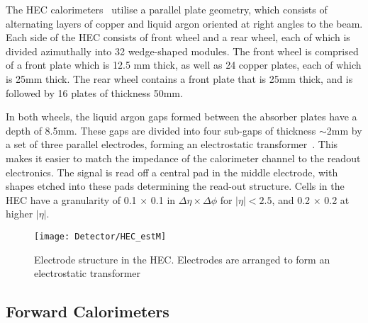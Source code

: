The HEC calorimeters~\cite{HEC_construction} utilise a parallel plate geometry, which consists of alternating layers of copper and liquid argon oriented at right angles to the beam. Each side of the HEC consists of front wheel and a rear wheel, each of which is divided azimuthally into 32 wedge-shaped modules. The front wheel is comprised of a front plate which is 12.5 mm thick, as well as 24 copper plates, each of which is 25mm thick. The rear wheel contains a front plate that is 25mm thick, and is followed by 16 plates of thickness 50mm. 

In both wheels, the liquid argon gaps formed between the absorber plates have a depth of 8.5mm. These gaps are divided into four sub-gaps of thickness $\sim$2mm by a set of three parallel electrodes, forming an electrostatic transformer~\cite{1990NIMPA}. This makes it easier to match the impedance of the calorimeter channel to the readout electronics. The signal is read off a central pad in the middle electrode, with shapes etched into these pads determining the read-out structure. Cells in the HEC have a granularity of 0.1 $\times$ 0.1 in $\Delta\eta \times\Delta\phi$ for $|\eta| < 2.5$, and  0.2 $\times$ 0.2 at higher $|\eta|$.

\begin{figure}[tb]
\begin{center}
\texttt{[image: Detector/HEC\_estM]}
\end{center}
\caption[Electrode structure in the HEC]{Electrode structure in the HEC. Electrodes are arranged to form an electrostatic transformer}
\label{hec_electrode_fig}
\end{figure}
%
%
%
% 
%
%



%
%
%



%
\subsection{Forward Calorimeters}
\label{chap_Detector_FCal}

